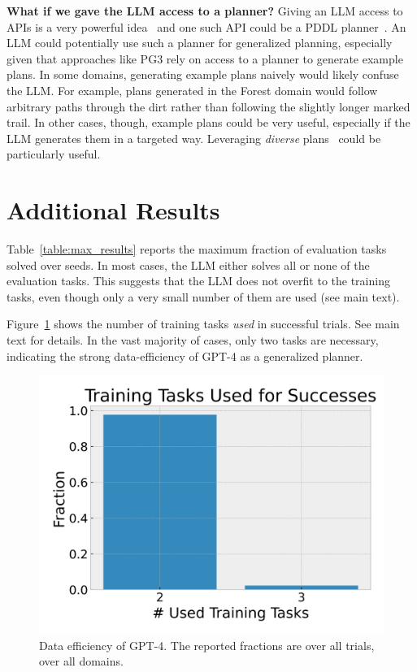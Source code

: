 \documentclass[letterpaper]{article} %
\begin{document}
\textbf{What if we gave the LLM access to a planner?}
Giving an LLM access to APIs is a very powerful idea~\cite{schick2023toolformer} and one such API could be a PDDL planner~\cite{liu2023llm}.
An LLM could potentially use such a planner for generalized planning, especially given that approaches like PG3 rely on access to a planner to generate example plans.
In some domains, generating example plans naively would likely confuse the LLM.
For example, plans generated in the Forest domain would follow arbitrary paths through the dirt rather than following the slightly longer marked trail.
In other cases, though, example plans could be very useful, especially if the LLM generates them in a targeted way.
Leveraging \emph{diverse} plans~\cite{sohrabi2016finding,katz2020reshaping} could be particularly useful.

\clearpage



\clearpage

\appendix

\section{Additional Results}

Table~\ref{table:max_results} reports the maximum fraction of evaluation tasks solved over seeds.
In most cases, the LLM either solves all or none of the evaluation tasks.
This suggests that the LLM does not overfit to the training tasks, even though only a very small number of them are used (see main text).

Figure~\ref{fig:num_training_tasks} shows the number of training tasks \emph{used} in successful trials.
See main text for details.
In the vast majority of cases, only two tasks are necessary, indicating the strong data-efficiency of GPT-4 as a generalized planner.



\begin{figure}[h]
    \centering
    \includegraphics[width=0.8\columnwidth]{num_necessary_training_tasks.png}
    \caption{Data efficiency of GPT-4. The reported fractions are over all trials, over all domains.}
    \label{fig:num_training_tasks}
\end{figure}
\end{document}
